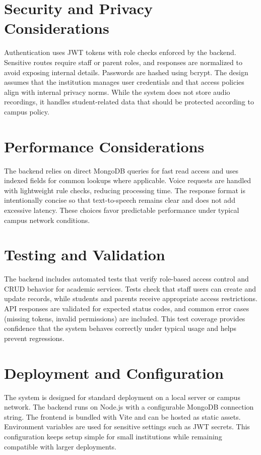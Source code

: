 ﻿\documentclass[conference]{IEEEtran}
\begin{document}
\section{Security and Privacy Considerations}
Authentication uses JWT tokens with role checks enforced by the backend. Sensitive routes require staff or parent roles, and responses are normalized to avoid exposing internal details. Passwords are hashed using bcrypt. The design assumes that the institution manages user credentials and that access policies align with internal privacy norms. While the system does not store audio recordings, it handles student-related data that should be protected according to campus policy.

\section{Performance Considerations}
The backend relies on direct MongoDB queries for fast read access and uses indexed fields for common lookups where applicable. Voice requests are handled with lightweight rule checks, reducing processing time. The response format is intentionally concise so that text-to-speech remains clear and does not add excessive latency. These choices favor predictable performance under typical campus network conditions.

\section{Testing and Validation}
The backend includes automated tests that verify role-based access control and CRUD behavior for academic services. Tests check that staff users can create and update records, while students and parents receive appropriate access restrictions. API responses are validated for expected status codes, and common error cases (missing tokens, invalid permissions) are included. This test coverage provides confidence that the system behaves correctly under typical usage and helps prevent regressions.

\section{Deployment and Configuration}
The system is designed for standard deployment on a local server or campus network. The backend runs on Node.js with a configurable MongoDB connection string. The frontend is bundled with Vite and can be hosted as static assets. Environment variables are used for sensitive settings such as JWT secrets. This configuration keeps setup simple for small institutions while remaining compatible with larger deployments.
\end{document}
